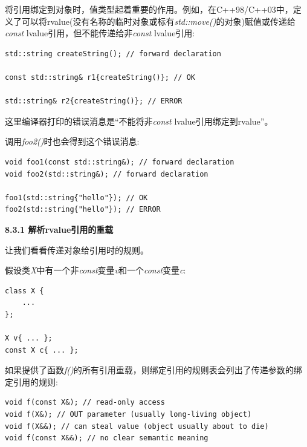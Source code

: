 将引用绑定到对象时，值类型起着重要的作用。例如，在C++98/C++03中，定义了可以将rvalue(没有名称的临时对象或标有\textit{std::move()}的对象)赋值或传递给\textit{const} lvalue引用，但不能传递给非\textit{const} lvalue引用:\par

\begin{lstlisting}[caption={}]
std::string createString(); // forward declaration

const std::string& r1{createString()}; // OK

std::string& r2{createString()}; // ERROR
\end{lstlisting}

这里编译器打印的错误消息是“不能将非\textit{const} lvalue引用绑定到rvalue”。\par

调用\textit{foo2()}时也会得到这个错误消息:\par

\begin{lstlisting}[caption={}]
void foo1(const std::string&); // forward declaration
void foo2(std::string&); // forward declaration

foo1(std::string{"hello"}); // OK
foo2(std::string{"hello"}); // ERROR
\end{lstlisting}

\hspace*{\fill} \par %
\textbf{8.3.1 解析rvalue引用的重载}

让我们看看传递对象给引用时的规则。\par

假设类\textit{X}中有一个非\textit{const}变量\textit{v}和一个\textit{const}变量\textit{c}:\par

\begin{lstlisting}[caption={}]
class X {
	...
};

X v{ ... };
const X c{ ... };
\end{lstlisting}

如果提供了函数\textit{f()}的所有引用重载，则绑定引用的规则表会列出了传递参数的绑定引用的规则:\par

\begin{lstlisting}[caption={}]
void f(const X&); // read-only access
void f(X&); // OUT parameter (usually long-living object)
void f(X&&); // can steal value (object usually about to die)
void f(const X&&); // no clear semantic meaning
\end{lstlisting}

